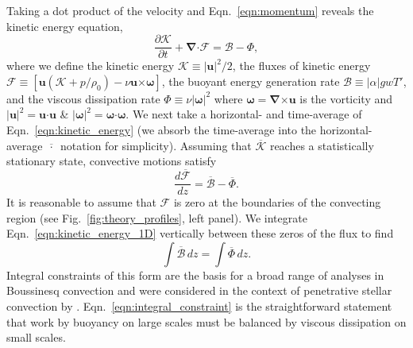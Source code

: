 \documentclass[twocolumn]{aastex631}
\renewcommand{\vec}[1]{\boldsymbol{#1}}
\renewcommand{\dot}{\vec{\cdot}}
\renewcommand{\bar}[1]{\overline{#1}}
\newcommand{\grad}{\vec{\nabla}}
\newcommand{\cross}{\vec{\times}}
\begin{document}
Taking a dot product of the velocity and Eqn.~\ref{eqn:momentum} reveals the kinetic energy equation,
\begin{equation}
\frac{\partial \mathcal{K}}{\partial t}
+ \grad\dot\mathcal{F}
= \mathcal{B} - \Phi,
\label{eqn:kinetic_energy}
\end{equation}
where we define the kinetic energy $\mathcal{K} \equiv |\vec{u}|^2/2$, the fluxes of kinetic energy $\mathcal{F} \equiv \left[\vec{u}(\mathcal{K} + p/\rho_0) - \nu\vec{u}\cross\vec{\omega} \right]$, the buoyant energy generation rate $\mathcal{B} \equiv |\alpha| g w T'$, and the viscous dissipation rate $\Phi \equiv \nu |\vec{\omega}|^2$ where $\vec{\omega} = \grad\cross\vec{u}$ is the vorticity and $|\vec{u}|^2 = \vec{u}\dot\vec{u}$ \& $|\vec{\omega}|^2 = \vec{\omega}\dot\vec{\omega}$.
We next take a horizontal- and time-average of Eqn.~\ref{eqn:kinetic_energy} (we absorb the time-average into the horizontal-average $\bar{\,\cdot\,}$ notation for simplicity).
Assuming that $\bar{\mathcal{K}}$ reaches a statistically stationary state, convective motions satisfy
\begin{equation}
\frac{d\bar{\mathcal{F}}}{dz} = \bar{\mathcal{B}} - \bar{\Phi}.
\label{eqn:kinetic_energy_1D}
\end{equation}
It is reasonable to assume that $\mathcal{F}$ is zero at the boundaries of the convecting region (see Fig.~\ref{fig:theory_profiles}, left panel).
We integrate Eqn.~\ref{eqn:kinetic_energy_1D} vertically between these zeros of the flux to find
\begin{equation}
\int \bar{\mathcal{B}}\,dz = \int \bar{\Phi}\,dz.
\label{eqn:integral_constraint}
\end{equation}
Integral constraints of this form are the basis for a broad range of analyses in Boussinesq convection \citep[see e.g.,][]{ahlers_etal_2009, goluskin2016} and were considered in the context of penetrative stellar convection by \citet{roxburgh1989}.
Eqn.~\ref{eqn:integral_constraint} is the straightforward statement that work by buoyancy on large scales must be balanced by viscous dissipation on small scales.
\end{document}
